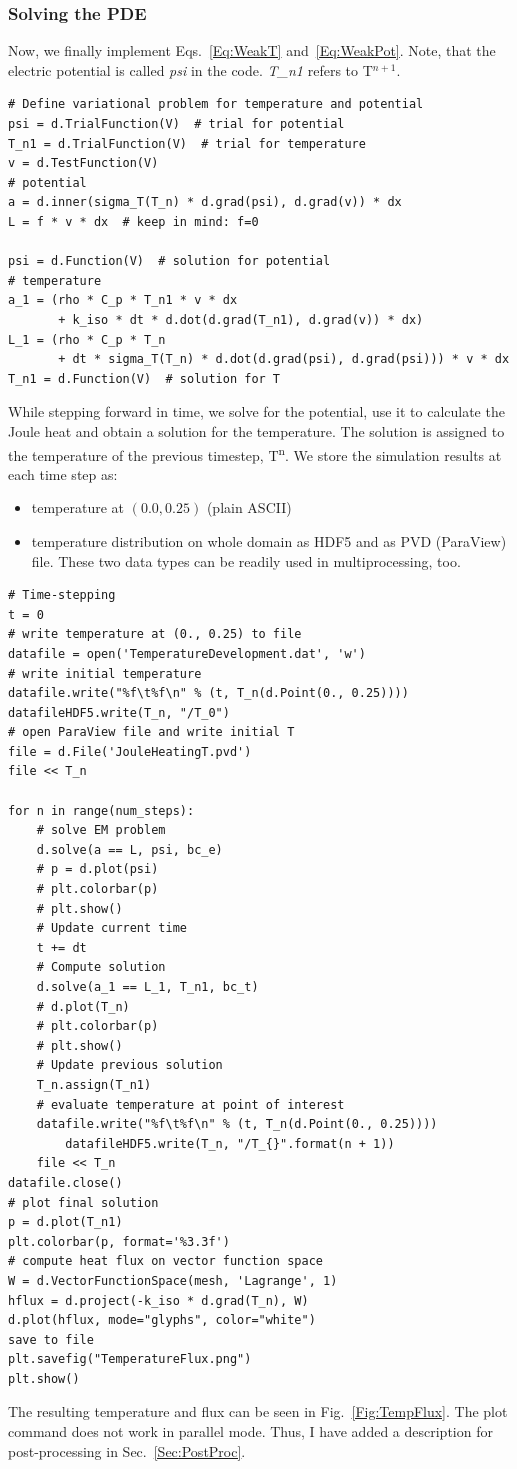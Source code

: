 \documentclass{article}
\begin{document}
\subsubsection{Solving the PDE}
Now, we finally implement Eqs.~\eqref{Eq:WeakT} and~\eqref{Eq:WeakPot}. Note, that the electric potential is called \textit{psi} in the code. \textit{T\_n1} refers to T$^{n+1}$.
\begin{lstlisting}
# Define variational problem for temperature and potential
psi = d.TrialFunction(V)  # trial for potential
T_n1 = d.TrialFunction(V)  # trial for temperature
v = d.TestFunction(V)
# potential 
a = d.inner(sigma_T(T_n) * d.grad(psi), d.grad(v)) * dx
L = f * v * dx  # keep in mind: f=0

psi = d.Function(V)  # solution for potential
# temperature
a_1 = (rho * C_p * T_n1 * v * dx
       + k_iso * dt * d.dot(d.grad(T_n1), d.grad(v)) * dx)
L_1 = (rho * C_p * T_n
       + dt * sigma_T(T_n) * d.dot(d.grad(psi), d.grad(psi))) * v * dx
T_n1 = d.Function(V)  # solution for T
\end{lstlisting}

While stepping forward in time, we solve for the potential, use it to calculate the Joule heat and obtain a solution for the temperature. 
The solution is assigned to the temperature of the previous timestep, T\textsuperscript{n}.
We store the simulation results at each time step as:
\begin{itemize}
\item temperature at $(0.0, 0.25)$ (plain ASCII)
\item temperature distribution on whole domain as HDF5 and as PVD (ParaView) file. These two data types can be readily used in multiprocessing, too.
\end{itemize}
\begin{lstlisting}
# Time-stepping
t = 0
# write temperature at (0., 0.25) to file
datafile = open('TemperatureDevelopment.dat', 'w')
# write initial temperature
datafile.write("%f\t%f\n" % (t, T_n(d.Point(0., 0.25))))
datafileHDF5.write(T_n, "/T_0")
# open ParaView file and write initial T
file = d.File('JouleHeatingT.pvd')
file << T_n

for n in range(num_steps):
    # solve EM problem
    d.solve(a == L, psi, bc_e)
    # p = d.plot(psi)
    # plt.colorbar(p)
    # plt.show()
    # Update current time
    t += dt
    # Compute solution
    d.solve(a_1 == L_1, T_n1, bc_t)
    # d.plot(T_n)
    # plt.colorbar(p)
    # plt.show()
    # Update previous solution
    T_n.assign(T_n1)
    # evaluate temperature at point of interest
    datafile.write("%f\t%f\n" % (t, T_n(d.Point(0., 0.25))))
        datafileHDF5.write(T_n, "/T_{}".format(n + 1))
    file << T_n
datafile.close()
# plot final solution
p = d.plot(T_n1)
plt.colorbar(p, format='%3.3f')
# compute heat flux on vector function space
W = d.VectorFunctionSpace(mesh, 'Lagrange', 1)
hflux = d.project(-k_iso * d.grad(T_n), W)
d.plot(hflux, mode="glyphs", color="white")
save to file
plt.savefig("TemperatureFlux.png")
plt.show()
\end{lstlisting}
The resulting temperature and flux can be seen in Fig.~\ref{Fig:TempFlux}.
The plot command does not work in parallel mode.
Thus, I have added a description for post-processing in Sec.~\ref{Sec:PostProc}.
\end{document}
